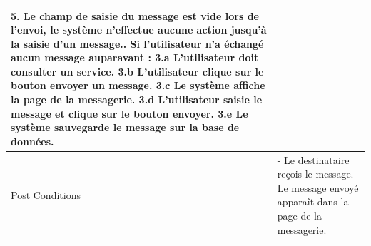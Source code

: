 \documentclass[french]{report}
\begin{document}
\begin{description}
\begin{minipage}{\linewidth}
\begin{tabular}{|m{3cm}|m{9cm}|}
                5. Le champ de saisie du message est vide lors de l'envoi, le système
		n'effectue aucune action jusqu'à la saisie d'un message.\newline
                3. Si l'utilisateur n'a échangé aucun message auparavant : \newline
                	3.a L'utilisateur doit consulter un service. \newline
                	3.b L'utilisateur clique sur le bouton envoyer un message. \newline
                	3.c Le système affiche la page de la messagerie. \newline
                	3.d L'utilisateur saisie le message et clique sur le bouton envoyer. \newline
                	3.e Le système sauvegarde le message sur la base de données. \newline
            \\ 
            \hline
            Post Conditions & 
                - Le destinataire reçois le message. \newline
                - Le message envoyé apparaît dans la page de la messagerie.  \newline
            \\
            \hline
            \end{tabular}
        \end{minipage}
        

\end{description}
\end{document}
